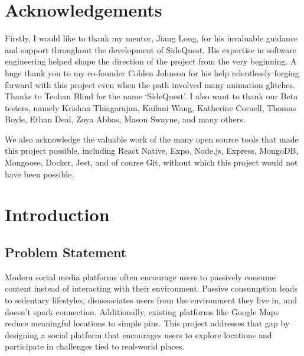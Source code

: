 \documentclass[12pt,a4paper,oneside]{report}
\begin{document}
\chapter*{Acknowledgements}

Firstly, I would like to thank my mentor, Jiang Long, for his invaluable guidance and support throughout the development of SideQuest. His expertise in software engineering helped shape the direction of the project from the very beginning. A huge thank you to my co-founder Colden Johnson for his help relentlessly forging forward with this project even when the path involved many animation glitches. Thanks to Teohan Blind for the name `SideQuest'. I also want to thank our Beta testers, namely Krishna Thiagarajan, Kailani Wang, Katherine Cornell, Thomas Boyle, Ethan Deal, Zoya Abbas, Mason Swayne, and many others.

We also acknowledge the valuable work of the many open source tools that made this project possible, including React Native, Expo, Node.js, Express, MongoDB, Mongoose, Docker, Jest, and of course Git, without which this project would not have been possible.
\newpage

\listoffigures
\newpage


\clearpage
{}

\chapter{Introduction}
\label{ch:introduction}

\section{Problem Statement}
 Modern social media platforms often encourage users to passively consume content instead of interacting with their environment. Passive consumption leads to sedentary lifestyles, disassociates users from the environment they live in, and doesn't spark connection. Additionally, existing platforms like Google Maps reduce meaningful locations to simple pins. This project addresses that gap by designing a social platform that encourages users to explore locations and participate in challenges tied to real-world places.
\end{document}
